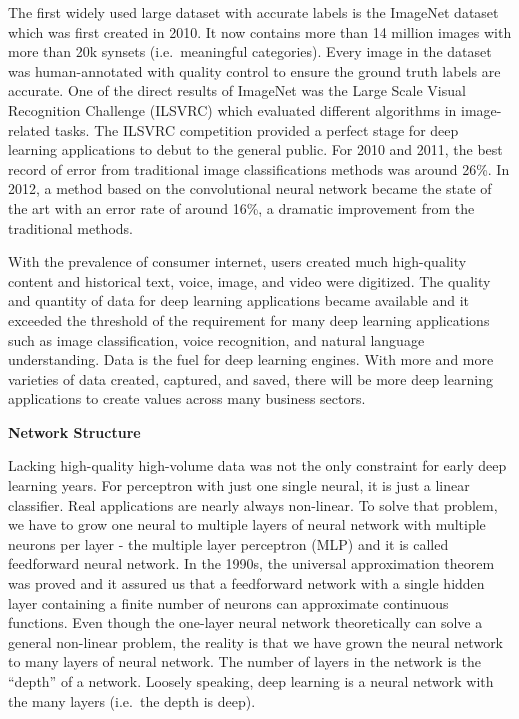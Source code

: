 \documentclass[12pt,]{krantz}
\begin{document}
The first widely used large dataset with accurate labels is the ImageNet dataset which was first created in 2010. It now contains more than 14 million images with more than 20k synsets (i.e.~meaningful categories). Every image in the dataset was human-annotated with quality control to ensure the ground truth labels are accurate. One of the direct results of ImageNet was the Large Scale Visual Recognition Challenge (ILSVRC) which evaluated different algorithms in image-related tasks. The ILSVRC competition provided a perfect stage for deep learning applications to debut to the general public. For 2010 and 2011, the best record of error from traditional image classifications methods was around 26\%. In 2012, a method based on the convolutional neural network became the state of the art with an error rate of around 16\%, a dramatic improvement from the traditional methods.

With the prevalence of consumer internet, users created much high-quality content and historical text, voice, image, and video were digitized. The quality and quantity of data for deep learning applications became available and it exceeded the threshold of the requirement for many deep learning applications such as image classification, voice recognition, and natural language understanding. Data is the fuel for deep learning engines. With more and more varieties of data created, captured, and saved, there will be more deep learning applications to create values across many business sectors.

\textbf{Network Structure}

Lacking high-quality high-volume data was not the only constraint for early deep learning years. For perceptron with just one single neural, it is just a linear classifier. Real applications are nearly always non-linear. To solve that problem, we have to grow one neural to multiple layers of neural network with multiple neurons per layer - the multiple layer perceptron (MLP) and it is called feedforward neural network. In the 1990s, the universal approximation theorem was proved and it assured us that a feedforward network with a single hidden layer containing a finite number of neurons can approximate continuous functions. Even though the one-layer neural network theoretically can solve a general non-linear problem, the reality is that we have grown the neural network to many layers of neural network. The number of layers in the network is the ``depth'' of a network. Loosely speaking, deep learning is a neural network with the many layers (i.e.~the depth is deep).
\end{document}
